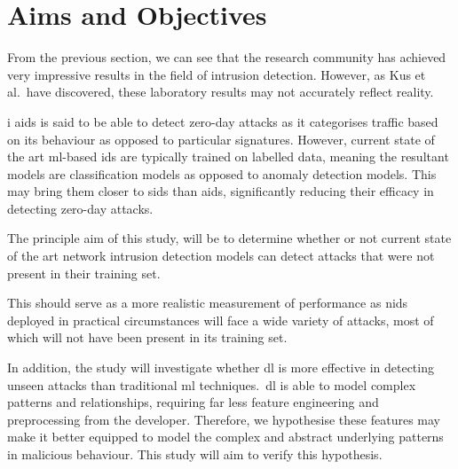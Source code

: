 \chapter{Aims and Objectives}%
\label{chp:aims}




From the previous section, we can see that the research community has achieved
very impressive results in the field of intrusion detection. However, as Kus et
al.\ have discovered, these laboratory results may not accurately reflect
reality.

i \gls{aids} is said to be able to detect zero-day attacks as it categorises
traffic based on its behaviour as opposed to particular signatures. However,
current state of the art \gls{ml}-based \gls{ids} are typically trained on
labelled data, meaning the resultant models are classification models as
opposed to anomaly detection models. This may bring them closer to \gls{sids}
than \gls{aids}, significantly reducing their efficacy in detecting zero-day
attacks.

The principle aim of this study, will be to determine whether or not current
state of the art network intrusion detection models can detect attacks that
were not present in their training set.

This should serve as a more realistic measurement of performance as \gls{nids}
deployed in practical circumstances will face a wide variety of attacks, most
of which will not have been present in its training set.

In addition, the study will investigate whether \gls{dl} is more effective in
detecting unseen attacks than traditional \gls{ml} techniques.\ \gls{dl} is
able to model complex patterns and relationships, requiring far less feature
engineering and preprocessing from the developer. Therefore, we hypothesise
these features may make it better equipped to model the complex and abstract
underlying patterns in malicious behaviour. This study will aim to verify this
hypothesis.
